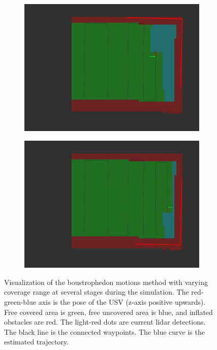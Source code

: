 \begin{figure}[h!]
{\begin{subfigure}[b]{0.5\textwidth}
		\centering
		\includegraphics[height=0.20\textheight,width=1\textwidth]{fig/simulations/bm2_alg4}
		\caption{}
	\end{subfigure}
	\begin{subfigure}[b]{0.5\textwidth}
		\centering
		\includegraphics[height=0.20\textheight,width=1\textwidth]{fig/simulations/bm2_alg5}
		\caption{}
	\end{subfigure}
	}
    \caption[Visualization of the boustrophedon motions method with varying coverage range at several stages during the simulation.]{Visualization of the boustrophedon motions method with varying coverage range at several stages during the simulation. The red-green-blue axis is the pose of the USV (z-axis positive upwards). Free covered area is green, free uncovered area is blue, and inflated obstacles are red. The light-red dots are current lidar detections. The black line is the connected waypoints. The blue curve is the estimated trajectory.}
	\label{fig:bm2_res}
\end{figure}




